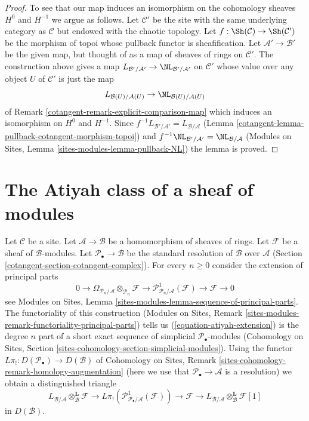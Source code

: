 \begin{proof}
\medskip\noindent
To see that our map induces an isomorphism on the cohomology sheaves
$H^0$ and $H^{-1}$ we argue as follows. Let $\mathcal{C}'$ be the site
with the same underlying category as $\mathcal{C}$ but endowed with the
chaotic topology. Let $f : \Sh(\mathcal{C}) \to \Sh(\mathcal{C}')$ be
the morphism of topoi whose pullback functor is sheafification.
Let $\mathcal{A}' \to \mathcal{B}'$ be the given map, but thought of
as a map of sheaves of rings on $\mathcal{C}'$. The construction above
gives a map $L_{\mathcal{B}'/\mathcal{A}'} \to \NL_{\mathcal{B}'/\mathcal{A}'}$
on $\mathcal{C}'$ whose value over any object $U$ of $\mathcal{C}'$
is just the map
$$
L_{\mathcal{B}(U)/\mathcal{A}(U)} \to \NL_{\mathcal{B}(U)/\mathcal{A}(U)}
$$
of Remark \ref{cotangent-remark-explicit-comparison-map} which induces an isomorphism
on $H^0$ and $H^{-1}$. Since
$f^{-1}L_{\mathcal{B}'/\mathcal{A}'} = L_{\mathcal{B}/\mathcal{A}}$
(Lemma \ref{cotangent-lemma-pullback-cotangent-morphism-topoi})
and
$f^{-1}\NL_{\mathcal{B}'/\mathcal{A}'} = \NL_{\mathcal{B}/\mathcal{A}}$
(Modules on Sites, Lemma \ref{sites-modules-lemma-pullback-NL})
the lemma is proved.
\end{proof}

\section{The Atiyah class of a sheaf of modules}
\label{cotangent-section-atiyah-general}
Let $\mathcal{C}$ be a site. Let $\mathcal{A} \to \mathcal{B}$ be a
homomorphism of sheaves of rings. Let $\mathcal{F}$ be a
sheaf of $\mathcal{B}$-modules. Let $\mathcal{P}_\bullet \to \mathcal{B}$
be the standard resolution of $\mathcal{B}$ over $\mathcal{A}$
(Section \ref{cotangent-section-cotangent-complex}).
For every $n \geq 0$ consider the extension of principal parts
\begin{equation}
\label{equation-atiyah-extension}
0 \to
\Omega_{\mathcal{P}_n/\mathcal{A}} \otimes_{\mathcal{P}_n} \mathcal{F} \to
\mathcal{P}^1_{\mathcal{P}_n/\mathcal{A}}(\mathcal{F}) \to
\mathcal{F} \to 0
\end{equation}
see
Modules on Sites, Lemma \ref{sites-modules-lemma-sequence-of-principal-parts}.
The functoriality of this construction
(Modules on Sites, Remark
\ref{sites-modules-remark-functoriality-principal-parts})
tells us (\ref{equation-atiyah-extension}) is the degree $n$ part of
a short exact sequence of simplicial $\mathcal{P}_\bullet$-modules
(Cohomology on Sites, Section
\ref{sites-cohomology-section-simplicial-modules}).
Using the functor $L\pi_! : D(\mathcal{P}_\bullet) \to D(\mathcal{B})$
of Cohomology on Sites, Remark
\ref{sites-cohomology-remark-homology-augmentation}
(here we use that $\mathcal{P}_\bullet \to \mathcal{A}$ is a resolution)
we obtain a distinguished triangle
\begin{equation}
\label{equation-atiyah-general}
L_{\mathcal{B}/\mathcal{A}} \otimes_\mathcal{B}^\mathbf{L} \mathcal{F} \to
L\pi_!\left(\mathcal{P}^1_{\mathcal{P}_\bullet/\mathcal{A}}(\mathcal{F})\right)
\to \mathcal{F} \to
L_{\mathcal{B}/\mathcal{A}} \otimes_\mathcal{B}^\mathbf{L} \mathcal{F} [1]
\end{equation}
in $D(\mathcal{B})$.

